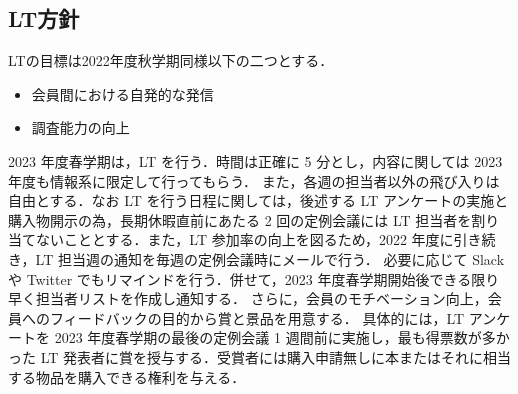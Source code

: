\subsection*{LT方針}


LTの目標は2022年度秋学期同様以下の二つとする．
\begin{itemize}
    \item 会員間における自発的な発信
    \item 調査能力の向上
\end{itemize}
2023 年度春学期は\secondGrade， LT を行う．時間は正確に 5 分とし，内容に関しては 2023 年度も情報系に限定して行ってもらう．
また，各週の担当者以外の飛び入りは自由とする．なお LT を行う日程に関しては，後述する LT アンケートの実施と購入物開示の為，長期休暇直前にあたる 2 回の定例会議には LT 担当者を割り当てないこととする．また，LT 参加率の向上を図るため，2022 年度に引き続き，LT 担当週の通知を毎週の定例会議時にメールで行う．
必要に応じて Slack や Twitter でもリマインドを行う．併せて，2023 年度春学期開始後できる限り早く担当者リストを作成し通知する．
さらに，会員のモチベーション向上，会員へのフィードバックの目的から賞と景品を用意する．
具体的には，LT アンケートを 2023 年度春学期の最後の定例会議 1 週間前に実施し，最も得票数が多かった LT 発表者に賞を授与する．受賞者には購入申請無しに本またはそれに相当する物品を購入できる権利を与える．